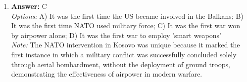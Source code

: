 \documentclass[12pt]{article}
\begin{document}
\begin{enumerate}[label=\arabic*.]
\\ \textit{Note:} The correct answer "All of the above" signifies that multiple factors, including strategic military decisions, political circumstances, and the socio-economic context of the time, collectively contributed to the United States' ability to avert disaster during the British invasion in 1814, highlighting the complexity of historical events where no single factor can be isolated as the sole reason for the outcome.
\item \textbf{Answer:} C
\\ \textit{Options:} A) It was the first time the US became involved in the Balkans; B) It was the first time NATO used military force; C) It was the first war won by airpower alone; D) It was the first war to employ 'smart weapons'
\\ \textit{Note:} The NATO intervention in Kosovo was unique because it marked the first instance in which a military conflict was successfully concluded solely through aerial bombardment, without the deployment of ground troops, demonstrating the effectiveness of airpower in modern warfare.
\end{enumerate}
\end{document}
